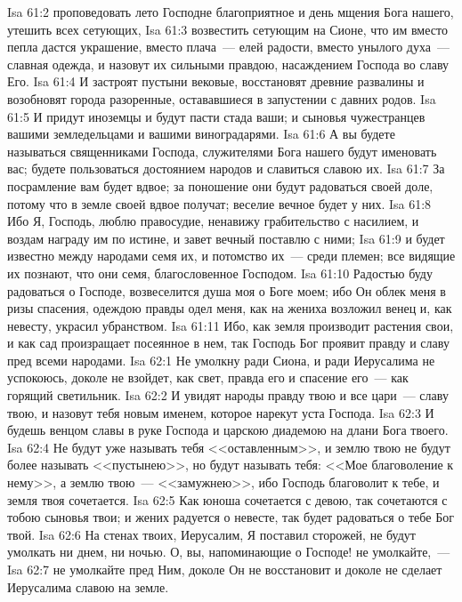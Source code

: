 \vs Isa 61:2 проповедовать лето Господне благоприятное и день мщения Бога нашего, утешить всех сетующих,
\vs Isa 61:3 возвестить сетующим на Сионе, что им вместо пепла дастся украшение, вместо плача~--- елей радости, вместо унылого духа~--- славная одежда, и назовут их сильными правдою, насаждением Господа во славу Его.
\vs Isa 61:4 И застроят пустыни вековые, восстановят древние развалины и возобновят города разоренные, остававшиеся в запустении с давних родов.
\vs Isa 61:5 И придут иноземцы и будут пасти стада ваши; и сыновья чужестранцев  вашими земледельцами и вашими виноградарями.
\vs Isa 61:6 А вы будете называться священниками Господа, служителями Бога нашего будут именовать вас; будете пользоваться достоянием народов и славиться славою их.
\vs Isa 61:7 За посрамление вам будет вдвое; за поношение они будут радоваться своей доле, потому что в земле своей вдвое получат; веселие вечное будет у них.
\vs Isa 61:8 Ибо Я, Господь, люблю правосудие, ненавижу грабительство с насилием, и воздам награду им по истине, и завет вечный поставлю с ними;
\vs Isa 61:9 и будет известно между народами семя их, и потомство их~--- среди племен; все видящие их познают, что они семя, благословенное Господом.
\vs Isa 61:10 Радостью буду радоваться о Господе, возвеселится душа моя о Боге моем; ибо Он облек меня в ризы спасения, одеждою правды одел меня, как на жениха возложил венец и, как невесту, украсил убранством.
\vs Isa 61:11 Ибо, как земля производит растения свои, и как сад произращает посеянное в нем, так Господь Бог проявит правду и славу пред всеми народами.
\vs Isa 62:1 Не умолкну ради Сиона, и ради Иерусалима не успокоюсь, доколе не взойдет, как свет, правда его и спасение его~--- как горящий светильник.
\vs Isa 62:2 И увидят народы правду твою и все цари~--- славу твою, и назовут тебя новым именем, которое нарекут уста Господа.
\vs Isa 62:3 И будешь венцом славы в руке Господа и царскою диадемою на длани Бога твоего.
\vs Isa 62:4 Не будут уже называть тебя <<оставленным>>, и землю твою не будут более называть <<пустынею>>, но будут называть тебя: <<Мое благоволение к нему>>, а землю твою~--- <<замужнею>>, ибо Господь благоволит к тебе, и земля твоя сочетается.
\vs Isa 62:5 Как юноша сочетается с девою, так сочетаются с тобою сыновья твои; и  жених радуется о невесте, так будет радоваться о тебе Бог твой.
\vs Isa 62:6 На стенах твоих, Иерусалим, Я поставил сторожей,  не будут умолкать ни днем, ни ночью. О, вы, напоминающие о Господе! не умолкайте,~---
\vs Isa 62:7 не умолкайте пред Ним, доколе Он не восстановит и доколе не сделает Иерусалима славою на земле.
